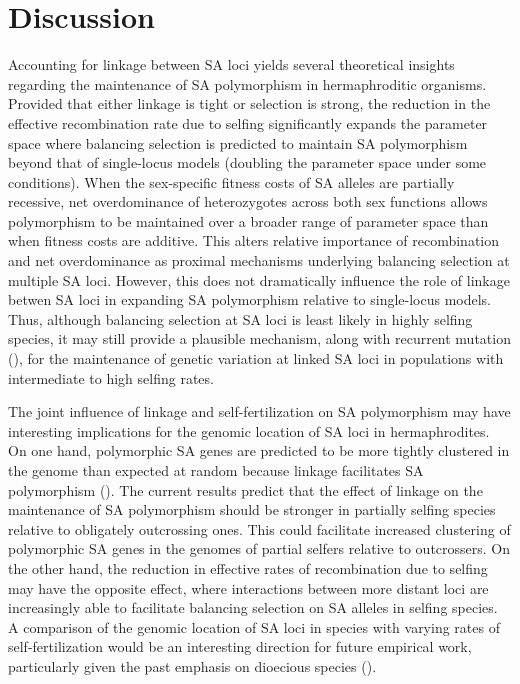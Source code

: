 \documentclass{article}
\begin{document}
\section*{Discussion}

Accounting for linkage between SA loci yields several theoretical insights regarding the maintenance of SA polymorphism in hermaphroditic organisms. Provided that either linkage is tight or selection is strong, the reduction in the effective recombination rate due to selfing significantly expands the parameter space where balancing selection is predicted to maintain SA polymorphism beyond that of single-locus models (doubling the parameter space under some conditions). When the sex-specific fitness costs of SA alleles are partially recessive, net overdominance of heterozygotes across both sex functions allows polymorphism to be maintained over a broader range of parameter space than when fitness costs are additive. This alters relative importance of recombination and net overdominance as proximal mechanisms underlying balancing selection at multiple SA loci. However, this does not dramatically influence the role of linkage betwen SA loci in expanding SA polymorphism relative to single-locus models. Thus, although balancing selection at SA loci is least likely in highly selfing species, it may still provide a plausible mechanism, along with recurrent mutation (\citealt{JordanConn2014}), for the maintenance of genetic variation at linked SA loci in populations with intermediate to high selfing rates. 

{\color{blue} The joint influence of linkage and self-fertilization on SA polymorphism may have interesting implications for the genomic location of SA loci in hermaphrodites. On one hand, polymorphic SA genes are predicted to be more tightly clustered in the genome than expected at random because linkage facilitates SA polymorphism (\citealt{Patten2010,JordanChar2011}). The current results predict that the effect of linkage on the maintenance of SA polymorphism should be stronger in partially selfing species relative to obligately outcrossing ones. This could facilitate increased clustering of polymorphic SA genes in the genomes of partial selfers relative to outcrossers. On the other hand, the reduction in effective rates of recombination due to selfing may have the opposite effect, where interactions between more distant loci are increasingly able to facilitate balancing selection on SA alleles in selfing species. A comparison of the genomic location of SA loci in species with varying rates of self-fertilization would be an interesting direction for future empirical work, particularly given the past emphasis on dioecious species (\citealt{BondChen2009, Abbott2011}).}
\end{document}
